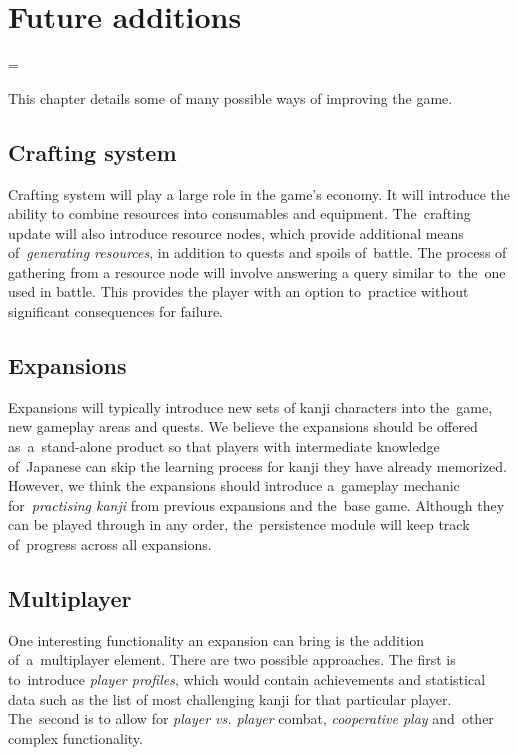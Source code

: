 \documentclass[thesis=B,english,hidelinks]{FITthesisXE}[2012/06/26]
\begin{document}
\chapter{Future additions}

\emergencystretch=\maxdimen
{}

This chapter details some of many possible ways of improving the game.

\section{Crafting system}

Crafting system will play a large role in the game's economy. It will introduce the ability to combine resources into consumables and equipment. The~crafting update will also introduce resource nodes, which provide additional means of~\emph{generating resources}, in addition to quests and spoils of~battle. The process of gathering from a resource node will involve answering a query similar to~the~one used in battle. This provides the player with an option to~practice without significant consequences for failure.

\section{Expansions}

Expansions will typically introduce new sets of kanji characters into the~game, new gameplay areas and quests. We believe the expansions should be offered as~a~stand-alone product so that players with intermediate knowledge of~Japanese can skip the learning process for kanji they have already memorized. However, we think the expansions should introduce a~gameplay mechanic for~\emph{practising kanji} from previous expansions and the~base game. Although they can be played through in any order, the~persistence module will keep track of~progress across all expansions.

\section{Multiplayer}

One interesting functionality an expansion can bring is the addition of~a~multiplayer element. There are two possible approaches. The first is to~introduce \emph{player profiles}, which would contain achievements and statistical data such as the list of most challenging kanji for that particular player. The~second is to allow for \emph{player vs. player} combat, \emph{cooperative play} and~other complex functionality.
\end{document}
